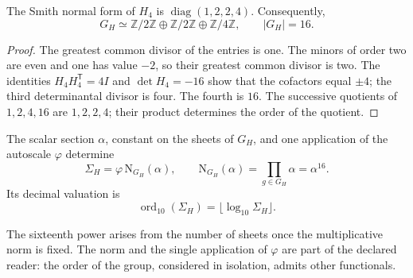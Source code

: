 \begin{lemma}
\label{x_reciprocidad:iv:action:smith}
The Smith normal form of \(H_4\) is
\(\operatorname{diag}(1,2,2,4)\). Consequently,
\[
 G_H\simeq\mathbb Z/2\mathbb Z\oplus\mathbb Z/2\mathbb Z
       \oplus\mathbb Z/4\mathbb Z,\qquad |G_H|=16.
\]
\end{lemma}
\begin{proof}
The greatest common divisor of the entries is one. The minors of
order two are even and one has value \(-2\), so their greatest
common divisor is two. The identities
\(H_4H_4^{\mathsf T}=4I\) and \(\det H_4=-16\) show that the
cofactors equal \(\pm4\); the third determinantal divisor is
four. The fourth is \(16\). The successive quotients of
\(1,2,4,16\) are \(1,2,2,4\); their product determines the order
of the quotient.
\end{proof}

\begin{definition}
\label{x_reciprocidad:iv:action:norma}
The scalar section \(\alpha\), constant on the sheets of \(G_H\),
and one application of the autoscale \(\varphi\) determine
\begin{equation}
 \Sigma_H=\varphi\,\mathrm N_{G_H}(\alpha),\qquad
 \mathrm N_{G_H}(\alpha)=\prod_{g\in G_H}\alpha=\alpha^{16}.
 \label{x_reciprocidad:iv:action:sigma}
\end{equation}
Its decimal valuation is
\[
 \operatorname{ord}_{10}(\Sigma_H)
   =\lfloor\log_{10}\Sigma_H\rfloor.
\]
\end{definition}
The sixteenth power arises from the number of sheets once
the multiplicative norm is fixed. The norm and the single application of
\(\varphi\) are part of the declared reader: the order of the group,
considered in isolation, admits other functionals.

